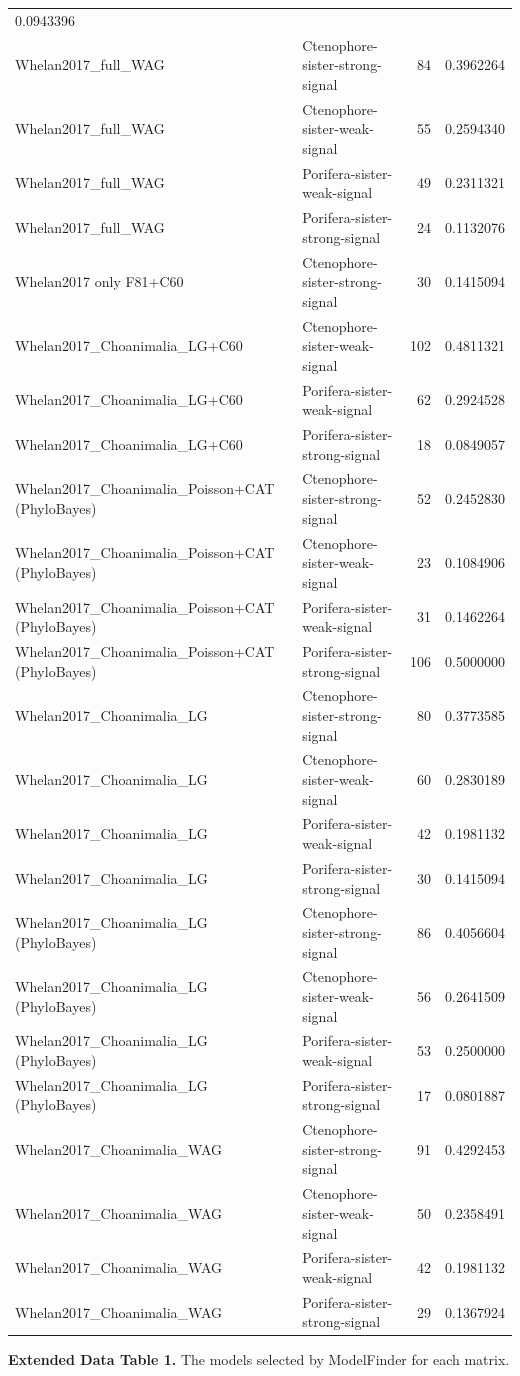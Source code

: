 \documentclass[]{article}
\begin{document}
\begin{longtable}[]{@{}llrr@{}}
0.0943396\tabularnewline
Whelan2017\_full\_WAG & Ctenophore-sister-strong-signal & 84 &
0.3962264\tabularnewline
Whelan2017\_full\_WAG & Ctenophore-sister-weak-signal & 55 &
0.2594340\tabularnewline
Whelan2017\_full\_WAG & Porifera-sister-weak-signal & 49 &
0.2311321\tabularnewline
Whelan2017\_full\_WAG & Porifera-sister-strong-signal & 24 &
0.1132076\tabularnewline
Whelan2017 only F81+C60 & Ctenophore-sister-strong-signal & 30 &
0.1415094\tabularnewline
Whelan2017\_Choanimalia\_LG+C60 & Ctenophore-sister-weak-signal & 102 &
0.4811321\tabularnewline
Whelan2017\_Choanimalia\_LG+C60 & Porifera-sister-weak-signal & 62 &
0.2924528\tabularnewline
Whelan2017\_Choanimalia\_LG+C60 & Porifera-sister-strong-signal & 18 &
0.0849057\tabularnewline
Whelan2017\_Choanimalia\_Poisson+CAT (PhyloBayes) &
Ctenophore-sister-strong-signal & 52 & 0.2452830\tabularnewline
Whelan2017\_Choanimalia\_Poisson+CAT (PhyloBayes) &
Ctenophore-sister-weak-signal & 23 & 0.1084906\tabularnewline
Whelan2017\_Choanimalia\_Poisson+CAT (PhyloBayes) &
Porifera-sister-weak-signal & 31 & 0.1462264\tabularnewline
Whelan2017\_Choanimalia\_Poisson+CAT (PhyloBayes) &
Porifera-sister-strong-signal & 106 & 0.5000000\tabularnewline
Whelan2017\_Choanimalia\_LG & Ctenophore-sister-strong-signal & 80 &
0.3773585\tabularnewline
Whelan2017\_Choanimalia\_LG & Ctenophore-sister-weak-signal & 60 &
0.2830189\tabularnewline
Whelan2017\_Choanimalia\_LG & Porifera-sister-weak-signal & 42 &
0.1981132\tabularnewline
Whelan2017\_Choanimalia\_LG & Porifera-sister-strong-signal & 30 &
0.1415094\tabularnewline
Whelan2017\_Choanimalia\_LG (PhyloBayes) &
Ctenophore-sister-strong-signal & 86 & 0.4056604\tabularnewline
Whelan2017\_Choanimalia\_LG (PhyloBayes) & Ctenophore-sister-weak-signal
& 56 & 0.2641509\tabularnewline
Whelan2017\_Choanimalia\_LG (PhyloBayes) & Porifera-sister-weak-signal &
53 & 0.2500000\tabularnewline
Whelan2017\_Choanimalia\_LG (PhyloBayes) & Porifera-sister-strong-signal
& 17 & 0.0801887\tabularnewline
Whelan2017\_Choanimalia\_WAG & Ctenophore-sister-strong-signal & 91 &
0.4292453\tabularnewline
Whelan2017\_Choanimalia\_WAG & Ctenophore-sister-weak-signal & 50 &
0.2358491\tabularnewline
Whelan2017\_Choanimalia\_WAG & Porifera-sister-weak-signal & 42 &
0.1981132\tabularnewline
Whelan2017\_Choanimalia\_WAG & Porifera-sister-strong-signal & 29 &
0.1367924\tabularnewline
\bottomrule
\end{longtable}

\textbf{Extended Data Table 1.} The models selected by ModelFinder for
each matrix.
\end{document}
